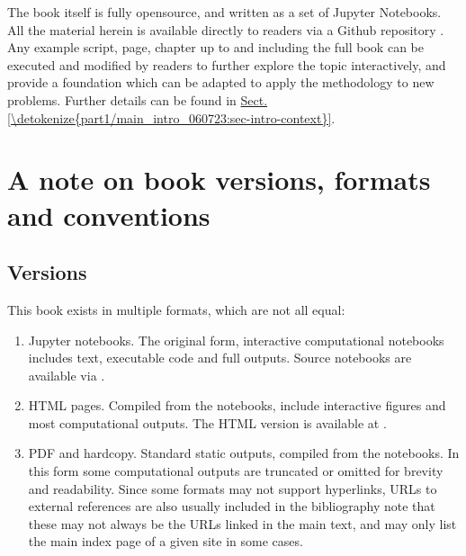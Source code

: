\documentclass[letterpaper,table,10pt,english]{jupyterBook}
\begin{document}
\sphinxAtStartPar
The book itself is fully open\sphinxhyphen{}source, and written as a set of Jupyter Notebooks. All the material herein is available directly to readers via a Github repository . Any example script, page, chapter \sphinxhyphen{} up to and including the full book \sphinxhyphen{} can be executed and modified by readers to further explore the topic interactively, and provide a foundation which can be adapted to apply the methodology to new problems. Further details can be found in \hyperref[\detokenize{part1/main_intro_060723:sec-intro-context}]{Sect.\@ \ref{\detokenize{part1/main_intro_060723:sec-intro-context}}}.

\sphinxstepscope


\chapter{A note on book versions, formats and conventions}
\label{\detokenize{frontmatter/book_versions_note:a-note-on-book-versions-formats-and-conventions}}\label{\detokenize{frontmatter/book_versions_note::doc}}

\section{Versions}
\label{\detokenize{frontmatter/book_versions_note:versions}}
\sphinxAtStartPar
This book exists in multiple formats, which are not all equal:
\begin{enumerate}
%
\item {} 
\sphinxAtStartPar
Jupyter notebooks. The original form, interactive computational notebooks includes text, executable code and full outputs. Source notebooks are available via .

\item {} 
\sphinxAtStartPar
HTML pages. Compiled from the notebooks, include interactive figures and most computational outputs. The HTML version is available at .

\item {} 
\sphinxAtStartPar
PDF and hard\sphinxhyphen{}copy. Standard static outputs, compiled from the notebooks. In this form some computational outputs are truncated or omitted for brevity and readability. Since some formats may not support hyperlinks, URLs to external references are also usually included in the bibliography \sphinxhyphen{} note that these may not always be the  URLs linked in the main text, and may only list the main index page of a given site in some cases.

\end{enumerate}
\end{document}
